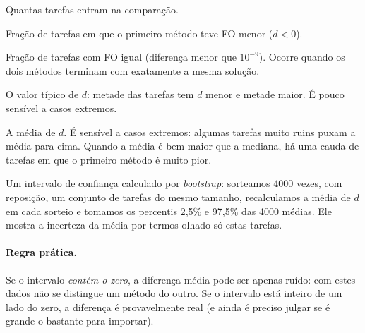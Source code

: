 \documentclass[11pt,a4paper]{article}
\begin{document}
\begin{description}[leftmargin=1.5em,style=nextline]
  \item[n] Quantas tarefas entram na comparação.
  \item[1º melhor] Fração de tarefas em que o primeiro método teve FO menor ($d<0$).
  \item[Empate] Fração de tarefas com FO igual (diferença menor que $10^{-9}$). Ocorre
  quando os dois métodos terminam com exatamente a mesma solução.
  \item[Mediana] O valor típico de $d$: metade das tarefas tem $d$ menor e metade
  maior. É pouco sensível a casos extremos.
  \item[Média] A média de $d$. É sensível a casos extremos: algumas tarefas muito
  ruins puxam a média para cima. Quando a média é bem maior que a mediana, há uma
  cauda de tarefas em que o primeiro método é muito pior.
  \item[IC 95\% da média] Um intervalo de confiança calculado por \emph{bootstrap}:
  sorteamos 4000 vezes, com reposição, um conjunto de tarefas do mesmo tamanho,
  recalculamos a média de $d$ em cada sorteio e tomamos os percentis 2,5\% e 97,5\%
  das 4000 médias. Ele mostra a incerteza da média por termos olhado só estas
  tarefas.
\end{description}

\paragraph{Regra prática.} Se o intervalo \emph{contém o zero}, a diferença média
pode ser apenas ruído: com estes dados não se distingue um método do outro. Se o
intervalo está inteiro de um lado do zero, a diferença é provavelmente real (e
ainda é preciso julgar se é grande o bastante para importar).

\begin{table}[H]
  \centering
  \scriptsize
  
  \caption{Comparação pareada da FO nas \nPaired{} tarefas analisadas.}
  \label{tab:pareada}
\end{table}
\end{document}
